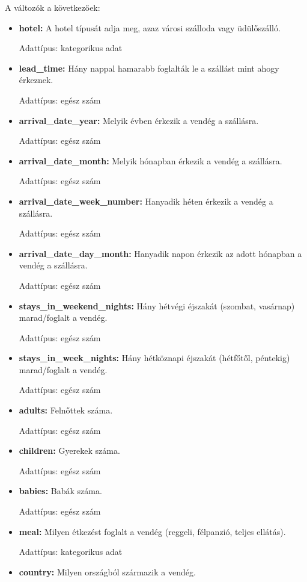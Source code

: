 A változók a következőek:
\begin{itemize}
    \item \textbf{hotel:} A hotel típusát adja meg, azaz városi szálloda vagy üdülőszálló. 
    
    Adattípus: kategorikus adat
    \item \textbf{lead\_time:} Hány nappal hamarabb foglalták le a szállást mint ahogy érkeznek. 
    
    Adattípus: egész szám
    \item \textbf{arrival\_date\_year:} Melyik évben érkezik a vendég a szállásra. 
    
    Adattípus: egész szám
    \item \textbf{arrival\_date\_month:} Melyik hónapban érkezik a vendég a szállásra. 
    
    Adattípus: egész szám
    \item \textbf{arrival\_date\_week\_number:} Hanyadik héten érkezik a vendég a szállásra. 
    
    Adattípus: egész szám
    \item \textbf{arrival\_date\_day\_month:} Hanyadik napon érkezik az adott hónapban a vendég a szállásra. 
    
    Adattípus: egész szám
    \item \textbf{stays\_in\_weekend\_nights:} Hány hétvégi éjszakát (szombat, vasárnap) marad/foglalt a vendég. 
    
    Adattípus: egész szám
    \item \textbf{stays\_in\_week\_nights:} Hány hétköznapi éjszakát (hétfőtől, péntekig) marad/foglalt a vendég. 
    
    Adattípus: egész szám
    \item \textbf{adults:} Felnőttek száma. 
    
    Adattípus: egész szám
    \item \textbf{children:} Gyerekek száma. 
    
    Adattípus: egész szám
    \item \textbf{babies:} Babák száma. 
    
    Adattípus: egész szám
    \item \textbf{meal:} Milyen étkezést foglalt a vendég (reggeli, félpanzió, teljes ellátás). 
    
    Adattípus: kategorikus adat
    \item \textbf{country:} Milyen országból származik a vendég. 
    

\end{itemize}
